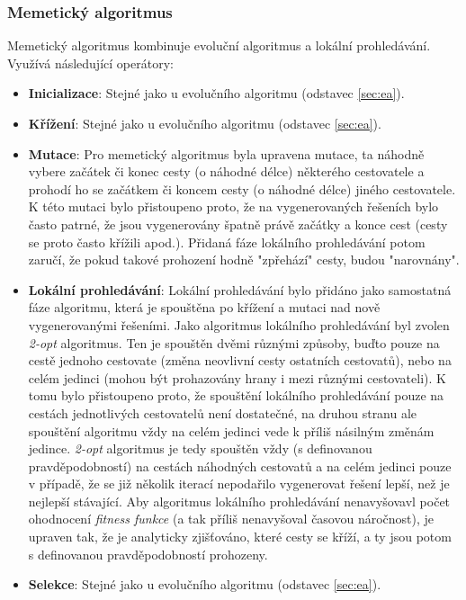 \documentclass[journal]{IEEEtrancz}
\begin{document}
\bigskip
\subsubsection{Memetický algoritmus}
Memetický algoritmus kombinuje evoluční algoritmus a lokální prohledávání. Využívá následující operátory: 
\begin{itemize}
  \item{\textbf{Inicializace}}: Stejné jako u evolučního algoritmu (odstavec \ref{sec:ea}).
  \item{\textbf{Křížení}}: Stejné jako u evolučního algoritmu (odstavec \ref{sec:ea}).
  \item{\textbf{Mutace}}: Pro memetický algoritmus byla upravena mutace, ta náhodně vybere začátek či konec cesty (o náhodné délce) některého cestovatele a prohodí ho se začátkem či koncem cesty (o náhodné délce) jiného cestovatele. K této mutaci bylo přistoupeno proto, že na vygenerovaných řešeních bylo často patrné, že jsou vygenerovány špatně právě začátky a konce cest (cesty se proto často křížili apod.). Přidaná fáze lokálního prohledávání potom zaručí, že pokud takové prohození hodně "zpřehází" cesty, budou "narovnány".   
  \item{\textbf{Lokální prohledávání}}: Lokální prohledávání bylo přidáno jako samostatná fáze algoritmu, která je spouštěna po křížení a mutaci nad nově vygenerovanými řešeními. Jako algoritmus lokálního prohledávání byl zvolen \textit{2-opt} algoritmus. 
  Ten je spouštěn dvěmi různými způsoby, buďto pouze na cestě jednoho cestovate (změna neovlivní cesty ostatních cestovatů), nebo na celém jedinci (mohou být prohazovány hrany i mezi různými cestovateli). K tomu bylo přistoupeno proto, že spouštění lokálního prohledávání pouze na cestách jednotlivých cestovatelů není dostatečné, na druhou stranu ale spouštění algoritmu vždy na celém jedinci vede k příliš násilným změnám jedince. \textit{2-opt} algoritmus je tedy spouštěn vždy (s definovanou pravděpodobností) na cestách náhodných cestovatů a na celém jedinci pouze v případě, že se již několik iterací nepodařilo vygenerovat řešení lepší, než je nejlepší stávající. 
  Aby algoritmus lokálního prohledávání nenavyšovavl počet ohodnocení \textit{fitness funkce} (a tak příliš nenavyšoval časovou náročnost), je upraven tak, že je analyticky zjišťováno, které cesty se kříží, a ty jsou potom s definovanou pravděpodobností prohozeny.
  \item{\textbf{Selekce}}: Stejné jako u evolučního algoritmu (odstavec \ref{sec:ea}). 
\end{itemize}  
\end{document}
